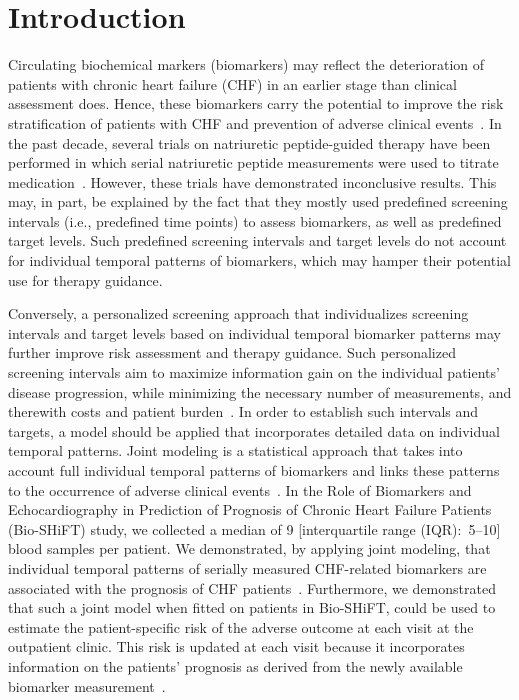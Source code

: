 \section{Introduction}
\label{c6:sec:introduction}
Circulating biochemical markers (biomarkers) may reflect the deterioration of patients with chronic heart failure (CHF) in an earlier stage than clinical assessment does. Hence, these biomarkers carry the potential to improve the risk stratification of patients with CHF and prevention of adverse clinical events~\citep{masson2008prognostic,gaggin2013biomarkers}. In the past decade, several trials on natriuretic peptide-guided therapy have been performed in which serial natriuretic peptide measurements were used to titrate medication~\citep{khan2018does,felker2017effect}. However, these trials have demonstrated inconclusive results. This may, in part, be explained by the fact that they mostly used predefined screening intervals (i.e., predefined time points) to assess biomarkers, as well as predefined target levels. Such predefined screening intervals and target levels do not account for individual temporal patterns of biomarkers, which may hamper their potential use for therapy guidance.

Conversely, a personalized screening approach that individualizes screening intervals and target levels based on individual temporal biomarker patterns may further improve risk assessment and therapy guidance. Such personalized screening intervals aim to maximize information gain on the individual patients' disease progression, while minimizing the necessary number of measurements, and therewith costs and patient burden~\citep{rizopoulos2016personalized}. In order to establish such intervals and targets, a model should be applied that incorporates detailed data on individual temporal patterns. Joint modeling is a statistical approach that takes into account full individual temporal patterns of biomarkers and links these patterns to the occurrence of adverse clinical events~\citep{rizopoulosJMbayes,rizopoulos2014tools}. In the Role of Biomarkers and Echocardiography in Prediction of Prognosis of Chronic Heart Failure Patients (Bio-SHiFT) study, we collected a median of 9 [interquartile range (IQR):~5--10] blood samples per patient. We demonstrated, by applying joint modeling, that individual temporal patterns of serially measured CHF-related biomarkers are associated with the prognosis of CHF patients~\citep{van2018toward}. Furthermore, we demonstrated that such a joint model when fitted on patients in Bio-SHiFT, could be used to estimate the patient-specific risk of the adverse outcome at each visit at the outpatient clinic. This risk is updated at each visit because it incorporates information on the patients' prognosis as derived from the newly available biomarker measurement~\citep{van2018toward}.


